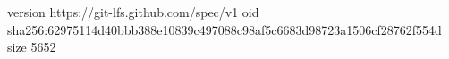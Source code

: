 version https://git-lfs.github.com/spec/v1
oid sha256:62975114d40bbb388e10839c497088c98af5c6683d98723a1506cf28762f554d
size 5652
